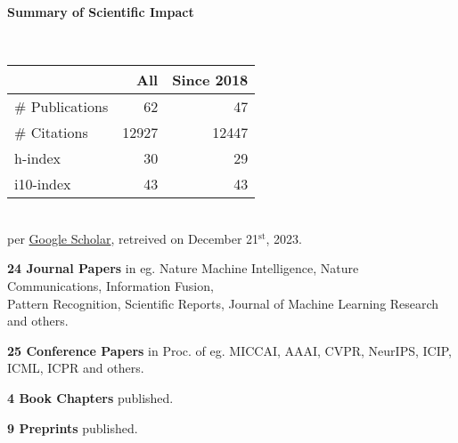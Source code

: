 \headedsection %
{\bf Summary of Scientific Impact}{}{}
{
    \qquad~~~~
    \begin{minipage}[t]{0.6\textwidth}
        \begin{tabular}{lrr}
        \hline
         & All & Since 2018\\
        \hline
        \# Publications & 62     & 47    \\
        \# Citations    & 12927  & 12447 \\
        h-index         & 30     & 29    \\
        i10-index       & 43     & 43    \\
        \hline
    \end{tabular}
    \\
    {\footnotesize{
        per \href{https://scholar.google.com/citations?user=wpLQuroAAAAJ}{Google Scholar},
        retreived on December 21$^\text{st}$, 2023.
        }
    }
    \end{minipage}

    \ifdefined\shortcv
        \vstep
        {\bf 24 Journal Papers} in eg. Nature Machine Intelligence, Nature Communications, Information Fusion,\\
        \hspace*{\fill} Pattern Recognition, Scientific Reports, Journal of Machine Learning Research and others.

        {\bf 25 Conference Papers} in Proc. of eg. MICCAI, AAAI, CVPR, NeurIPS, ICIP, ICML, ICPR and others.

        {\bf 4 Book Chapters} published.

        {\bf 9 Preprints} published.
        
    \else
        {}
    \fi

}
